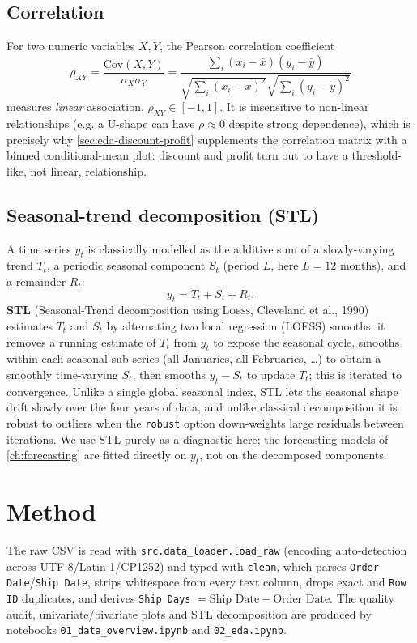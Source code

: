 \subsection{Correlation}
For two numeric variables $X, Y$, the Pearson correlation coefficient
\begin{equation}
  \rho_{XY} = \frac{\mathrm{Cov}(X,Y)}{\sigma_X \sigma_Y}
            = \frac{\sum_i (x_i - \bar x)(y_i - \bar y)}
                   {\sqrt{\sum_i (x_i-\bar x)^2}\sqrt{\sum_i (y_i-\bar y)^2}}
  \label{eq:pearson}
\end{equation}
measures \emph{linear} association, $\rho_{XY}\in[-1,1]$. It is
insensitive to non-linear relationships (e.g. a U-shape can have
$\rho \approx 0$ despite strong dependence), which is precisely why
\cref{sec:eda-discount-profit} supplements the correlation matrix with a
binned conditional-mean plot: discount and profit turn out to have a
threshold-like, not linear, relationship.

\subsection{Seasonal-trend decomposition (STL)}
A time series $y_t$ is classically modelled as the additive sum of a
slowly-varying trend $T_t$, a periodic seasonal component $S_t$ (period
$L$, here $L=12$ months), and a remainder $R_t$:
\begin{equation}
  y_t = T_t + S_t + R_t.
  \label{eq:stl-additive}
\end{equation}
\textbf{STL} (Seasonal-Trend decomposition using \textsc{Loess}, Cleveland
et al., 1990) estimates $T_t$ and $S_t$ by alternating two local
regression (LOESS) smooths: it removes a running estimate of $T_t$ from
$y_t$ to expose the seasonal cycle, smooths within each seasonal
sub-series (all Januaries, all Februaries, \dots) to obtain a smoothly
time-varying $S_t$, then smooths $y_t - S_t$ to update $T_t$; this is
iterated to convergence. Unlike a single global seasonal index, STL lets
the seasonal shape drift slowly over the four years of data, and unlike
classical decomposition it is robust to outliers when the \texttt{robust}
option down-weights large residuals between iterations. We use STL purely
as a diagnostic here; the forecasting models of \cref{ch:forecasting} are
fitted directly on $y_t$, not on the decomposed components.

\section{Method}
The raw CSV is read with \texttt{src.data\_loader.load\_raw} (encoding
auto-detection across UTF-8/Latin-1/CP1252) and typed with \texttt{clean},
which parses \texttt{Order Date}/\texttt{Ship Date}, strips whitespace from
every text column, drops exact and \texttt{Row ID} duplicates, and derives
\texttt{Ship Days} $= \text{Ship Date} - \text{Order Date}$. The quality
audit, univariate/bivariate plots and STL decomposition are produced by
notebooks \texttt{01\_data\_overview.ipynb} and \texttt{02\_eda.ipynb}.

